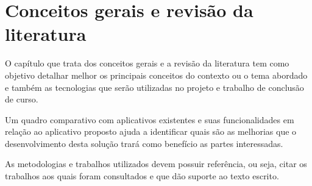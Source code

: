 \chapter{Conceitos gerais e revisão da literatura}

 O capítulo que trata dos conceitos gerais e a revisão da literatura tem como objetivo detalhar melhor os principais conceitos do contexto ou o tema abordado e também as tecnologias que serão utilizadas no projeto e trabalho de conclusão de curso.

Um quadro comparativo com aplicativos existentes e suas funcionalidades em relação ao aplicativo proposto ajuda a identificar quais são as melhorias que o desenvolvimento desta solução trará como benefício as partes interessadas.


 As metodologias e trabalhos utilizados devem possuir referência, ou seja, citar os trabalhos aos quais foram consultados e que dão suporte ao texto escrito.